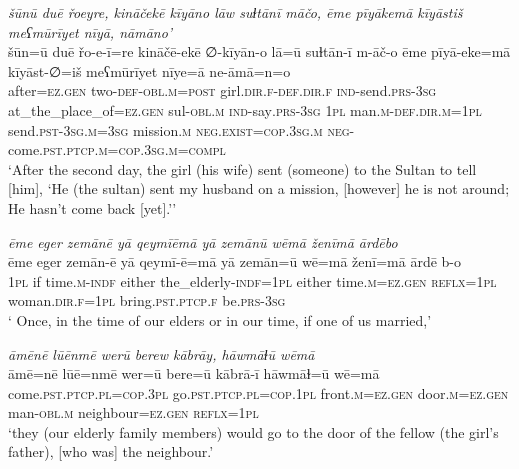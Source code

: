 \ea \label{ŽH.110}
\textit{šūnū duē řoeyre, kināčekē kīyāno lāw suɫtānī māčo, ēme pīyākemā kīyāstiš meʕmūrīyet nīyā, nāmāno’} \\ 
\gll šūn=ū duē řo-e-ī=re kināčē-ekē ∅-kīyān-o lā=ū suɫtān-ī m-āč-o ēme pīyā-eke=mā kīyāst-∅=iš meʕmūrīyet nīye=ā ne-āmā=n=o \\ 
 after\textsc{=ez}\textsc{.gen} two\textsc{-def}\textsc{-obl}\textsc{.m}\textsc{=\textsc{post}} girl\textsc{.dir}\textsc{\textsc{.f}}\textsc{-def}\textsc{.dir}\textsc{\textsc{.f}} \textsc{ind-}send\textsc{.prs}\textsc{-3sg} at\_the\_place\_of\textsc{=ez}\textsc{.gen} sul\textsc{-obl}\textsc{.m} \textsc{ind-}say\textsc{.prs}\textsc{-3sg} \textsc{1pl} man\textsc{.m}\textsc{-def}\textsc{.dir}\textsc{.m}\textsc{=1pl} send\textsc{.pst}\textsc{-3sg}\textsc{.m}\textsc{=3sg} mission\textsc{.m} \textsc{\textsc{neg.}exist}\textsc{=cop}\textsc{.3sg}\textsc{.m} \textsc{neg-}come\textsc{.pst}\textsc{.ptcp}\textsc{.m}\textsc{=cop}\textsc{.3sg}\textsc{.m}\textsc{=compl} \\ 
\glt `After the second day, the girl (his wife) sent (someone) to the Sultan to tell [him], ‘He (the sultan) sent my husband on a mission, [however] he is not around; He hasn’t come back [yet].’'
\z 
 
\ea \label{RE.2}
\textit{ēme eger zemānē yā qeymīēmā yā zemānū wēmā ženīmā ārdēbo} \\ 
\gll ēme eger zemān-ē yā qeymī-ē=mā yā zemān=ū wē=mā ženī=mā ārdē b-o \\ 
 \textsc{1pl} if time\textsc{.m}\textsc{-indf} either the\_elderly\textsc{-indf}\textsc{=\textsc{1pl}} either time\textsc{.m}\textsc{\textsc{=ez.gen}} \textsc{reflx}\textsc{=\textsc{1pl}} woman\textsc{.dir}\textsc{.f}\textsc{=\textsc{1pl}} bring\textsc{.pst}\textsc{.ptcp}\textsc{.f} be\textsc{.prs}\textsc{-3sg} \\ 
\glt ` Once, in the time of our elders or in our time, if one of us married,'
\z 
 
\ea \label{RE.3}
\textit{āmēnē lūēnmē werū berew kābrāy, hāwmāɫū wēmā} \\ 
\gll āmē=nē lūē=nmē wer=ū bere=ū kābrā-ī hāwmāɫ=ū wē=mā \\ 
 come\textsc{.pst}\textsc{.ptcp}\textsc{.pl}\textsc{=cop}\textsc{.3pl} go\textsc{.pst}\textsc{.ptcp}\textsc{.pl}\textsc{=cop}\textsc{.\textsc{1pl}} front\textsc{.m}\textsc{\textsc{=ez.gen}} door\textsc{.m}\textsc{\textsc{=ez.gen}} man\textsc{-obl}\textsc{.m} neighbour\textsc{\textsc{=ez.gen}} \textsc{reflx}\textsc{=\textsc{1pl}} \\ 
\glt `they (our elderly family members) would go to the door of the fellow (the girl’s father), [who was] the neighbour.'
\z 
 
